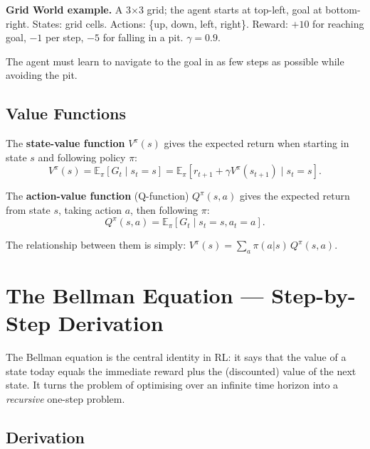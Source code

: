 \documentclass[12pt,a4paper]{article}
\begin{document}
\begin{exbox}
\textbf{Grid World example.}
A 3$\times$3 grid; the agent starts at top-left, goal at bottom-right.
States: grid cells.  Actions: \{up, down, left, right\}.
Reward: $+10$ for reaching goal, $-1$ per step, $-5$ for falling in a pit.
$\gamma = 0.9$.

The agent must learn to navigate to the goal in as few steps as possible
while avoiding the pit.
\end{exbox}

\subsection{Value Functions}

The \textbf{state-value function} $V^\pi(s)$ gives the expected return
when starting in state $s$ and following policy $\pi$:
\begin{equation}
  V^\pi(s) = \mathbb{E}_\pi\!\left[G_t \mid s_t = s\right]
           = \mathbb{E}_\pi\!\left[
               r_{t+1} + \gamma V^\pi(s_{t+1}) \mid s_t = s
             \right].
  \label{eq:vfunc}
\end{equation}

The \textbf{action-value function} (Q-function) $Q^\pi(s,a)$ gives the
expected return from state $s$, taking action $a$, then following $\pi$:
\begin{equation}
  Q^\pi(s,a) = \mathbb{E}_\pi\!\left[G_t \mid s_t=s, a_t=a\right].
  \label{eq:qfunc}
\end{equation}

The relationship between them is simply:
$V^\pi(s) = \sum_a \pi(a|s)\, Q^\pi(s,a)$.

\section{The Bellman Equation --- Step-by-Step Derivation}

\begin{insbox}
The Bellman equation is the central identity in RL: it says that the value
of a state today equals the immediate reward plus the (discounted) value
of the next state.  It turns the problem of optimising over an infinite
time horizon into a \emph{recursive} one-step problem.
\end{insbox}

\subsection{Derivation}
\end{document}
